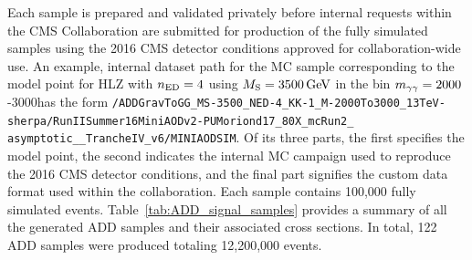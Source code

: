 Each sample is prepared and validated privately before internal requests within the CMS Collaboration are submitted for production of the fully simulated samples using the 2016 CMS detector conditions approved for collaboration-wide use. An example, internal dataset path for the MC sample corresponding to the model point for HLZ with $n_{\rm ED}=4$ using $M_{\rm S}=3500\,\text{Ge\hspace{-.08em}V}$ in the bin $m_{\gamma\gamma}=2000$-3000\GeV has the form \texttt{/ADDGravToGG\_\allowbreak MS-3500\_\allowbreak NED-4\_\allowbreak KK-1\_\allowbreak M-2000To3000\_\allowbreak 13TeV-\allowbreak sherpa/\allowbreak RunIISummer16MiniAODv2-\allowbreak PUMoriond17\_\allowbreak 80X\_\allowbreak mcRun2\_\\\allowbreak asymptotic\_\_\allowbreak TrancheIV\_\allowbreak v6/\allowbreak MINIAODSIM}. Of its three parts, the first specifies the model point, the second indicates the internal MC campaign used to reproduce the 2016 CMS detector conditions, and the final part signifies the custom data format used within the collaboration. Each sample contains 100,000 fully simulated events. Table~\ref{tab:ADD_signal_samples} provides a summary of all the generated ADD samples and their associated cross sections. In total, 122 ADD samples were produced totaling 12,200,000 events.


